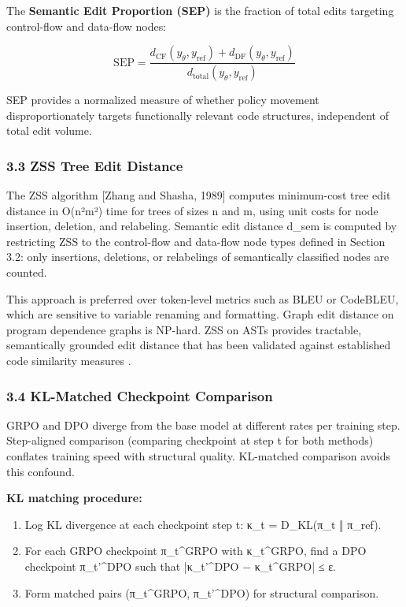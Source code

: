 The \textbf{Semantic Edit Proportion (SEP)} is the fraction of total edits targeting control-flow and data-flow nodes:

$$\text{SEP} = \frac{d_\text{CF}(y_\theta, y_\text{ref}) + d_\text{DF}(y_\theta, y_\text{ref})}{d_\text{total}(y_\theta, y_\text{ref})}$$

SEP provides a normalized measure of whether policy movement disproportionately targets functionally relevant code structures, independent of total edit volume.

\subsubsection{3.3 ZSS Tree Edit Distance}

The ZSS algorithm [Zhang and Shasha, 1989] computes minimum-cost tree edit distance in O(n²m²) time for trees of sizes n and m, using unit costs for node insertion, deletion, and relabeling. Semantic edit distance d_sem is computed by restricting ZSS to the control-flow and data-flow node types defined in Section 3.2: only insertions, deletions, or relabelings of semantically classified nodes are counted.

This approach is preferred over token-level metrics such as BLEU or CodeBLEU, which are sensitive to variable renaming and formatting. Graph edit distance on program dependence graphs is NP-hard. ZSS on ASTs provides tractable, semantically grounded edit distance that has been validated against established code similarity measures \citep{Dingetal2024}.

\subsubsection{3.4 KL-Matched Checkpoint Comparison}

GRPO and DPO diverge from the base model at different rates per training step. Step-aligned comparison (comparing checkpoint at step t for both methods) conflates training speed with structural quality. KL-matched comparison avoids this confound.

\textbf{KL matching procedure:}
\begin{enumerate}
\item Log KL divergence at each checkpoint step t: κ_t = D_KL(π_t ‖ π_ref).
\item For each GRPO checkpoint π_t^GRPO with κ_t^GRPO, find a DPO checkpoint π_{t'}^DPO such that |κ_{t'}^DPO − κ_t^GRPO| ≤ ε.
\item Form matched pairs (π_t^GRPO, π_{t'}^DPO) for structural comparison.
\end{enumerate}

